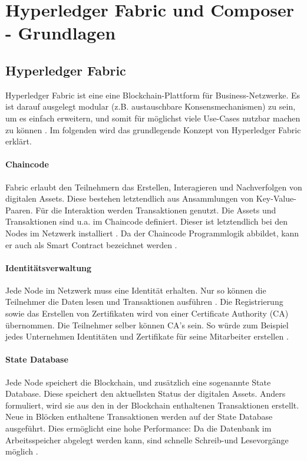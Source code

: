 \label{sec:hyperledger-fabric-composer}
\section{Hyperledger Fabric und Composer - Grundlagen}

\subsection{Hyperledger Fabric}
Hyperledger Fabric ist eine eine Blockchain-Plattform für Business-Netzwerke. Es ist darauf ausgelegt modular (z.B. austauschbare Konsensmechanismen) zu sein, um es einfach erweitern, und somit für möglichst viele Use-Cases nutzbar machen zu können \cite{HyperledgerFabricTeamHyperledgerWhitepaper2016}. Im folgenden wird das grundlegende Konzept von Hyperledger Fabric erklärt.

\paragraph{Chaincode}
Fabric erlaubt den Teilnehmern das Erstellen, Interagieren und Nachverfolgen von digitalen Assets. Diese bestehen letztendlich aus Ansammlungen von Key-Value-Paaren. Für die Interaktion werden Transaktionen genutzt. Die Assets und Transaktionen sind u.a. im Chaincode definiert. Dieser ist letztendlich bei den Nodes im Netzwerk installiert \cite{SchererPerformanceScalabilityBlockchain2017}. Da der Chaincode Programmlogik abbildet, kann er auch als Smart Contract bezeichnet werden \cite{HyperledgerFabricTeamChaincodeHyperledgerFabric}.

\paragraph{Identitätsverwaltung}
Jede Node im Netzwerk muss eine Identität erhalten. Nur so können die Teilnehmer die Daten lesen und Transaktionen ausführen \cite{SchererPerformanceScalabilityBlockchain2017}. Die Registrierung sowie das Erstellen von Zertifikaten wird von einer Certificate Authority (CA) übernommen. Die Teilnehmer selber können CA's sein. So würde zum Beispiel jedes Unternehmen Identitäten und Zertifikate für seine Mitarbeiter erstellen \cite{HyperledgerFabricTeamCAHyperledgerFabric}.

\paragraph{State Database}
Jede Node speichert die Blockchain, und zusätzlich eine sogenannte State Database. Diese speichert den aktuellsten Status der digitalen Assets. Anders formuliert, wird sie aus den in der Blockchain enthaltenen Transaktionen erstellt. Neue in Blöcken enthaltene Transaktionen werden auf der State Database ausgeführt. Dies ermöglicht eine hohe Performance: Da die Datenbank im Arbeitsspeicher abgelegt werden kann, sind schnelle Schreib-und Lesevorgänge möglich \cite{SchererPerformanceScalabilityBlockchain2017}.

